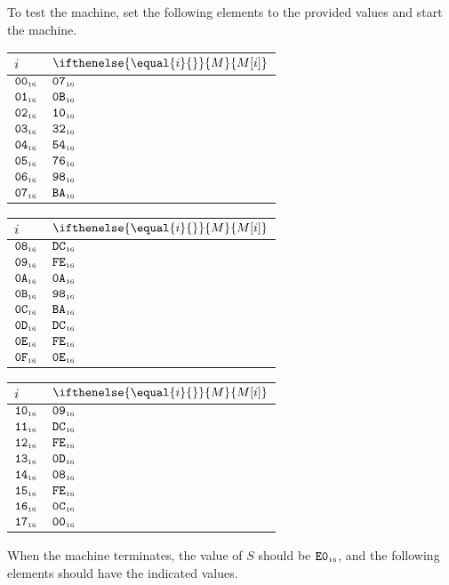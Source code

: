\documentclass[a4paper,12pt]{article}
\makeatletter
\newcommand{\num}[1]{\texttt{#1}}
\newcommand{\hex}[1]{\num{#1}_{\textup{\tiny 16}}}
\newcommand{\MEM}[1]{\ifthenelse{\equal{#1}{}}{M}{M[#1]}}
\newcommand{\SP}{S}
\newenvironment{memtable}{%
  \begin{trivlist}
    \item
    }{%
    \end{trivlist}}
\newenvironment{memcolumn}{%
  \begin{tabular}{@{}ll@{}}
    $i$ & $\MEM{i}$ \\
    \hline}
    {%
    \hline
  \end{tabular}}
\newcommand{\memspace}{\qquad}
\makeatother
\begin{document}
To test the machine, set the following elements to the provided values and start the machine.
\begin{memtable}
  \begin{memcolumn}
    $\hex{00}$ & $\hex{07}$ \\
    $\hex{01}$ & $\hex{0B}$ \\
    $\hex{02}$ & $\hex{10}$ \\
    $\hex{03}$ & $\hex{32}$ \\
    $\hex{04}$ & $\hex{54}$ \\
    $\hex{05}$ & $\hex{76}$ \\
    $\hex{06}$ & $\hex{98}$ \\
    $\hex{07}$ & $\hex{BA}$ \\
  \end{memcolumn}
  \memspace
  \begin{memcolumn}
    $\hex{08}$ & $\hex{DC}$ \\
    $\hex{09}$ & $\hex{FE}$ \\
    $\hex{0A}$ & $\hex{0A}$ \\
    $\hex{0B}$ & $\hex{98}$ \\
    $\hex{0C}$ & $\hex{BA}$ \\
    $\hex{0D}$ & $\hex{DC}$ \\
    $\hex{0E}$ & $\hex{FE}$ \\
    $\hex{0F}$ & $\hex{0E}$ \\
  \end{memcolumn}
  \memspace
  \begin{memcolumn}
    $\hex{10}$ & $\hex{09}$ \\
    $\hex{11}$ & $\hex{DC}$ \\
    $\hex{12}$ & $\hex{FE}$ \\
    $\hex{13}$ & $\hex{0D}$ \\
    $\hex{14}$ & $\hex{08}$ \\
    $\hex{15}$ & $\hex{FE}$ \\
    $\hex{16}$ & $\hex{0C}$ \\
    $\hex{17}$ & $\hex{00}$ \\
  \end{memcolumn}
\end{memtable}
When the machine terminates, the value of $\SP$ should be $\hex{E0}$, and the following elements should have the indicated values.
\end{document}
